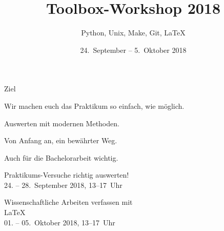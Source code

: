 

\title[Toolbox 2018]{Toolbox-Workshop 2018}
\subtitle{Python, Unix, Make, Git, \LaTeX{}}
\date{24.~September – 5.~Oktober 2018}
\author[Toolbox-Team]{}



\maketitle

\begin{frame}{Ziel}

  \huge
  Wir machen euch das Praktikum so einfach, wie möglich.

  Auswerten mit modernen Methoden.

  Von Anfang an, ein bewährter Weg.

  Auch für die Bachelorarbeit wichtig.
\end{frame}

\begin{frame}
  \vspace{2cm}
  \begin{center}
    \huge Praktikums-Versuche richtig auswerten!\\
    24. – 28.~September 2018, 13–17~Uhr
  \end{center}
\end{frame}

\begin{frame}
  \begin{center}
    \huge Wissenschaftliche Arbeiten verfassen mit \\[0.5\baselineskip]
    \textrm{\fontsize{80}{120}\selectfont\LaTeX{}}\\[0.5\baselineskip]
    01. – 05.~Oktober 2018, 13–17~Uhr
  \end{center}
\end{frame}

